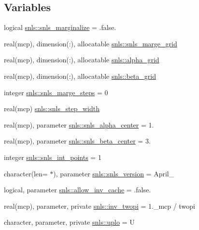 \subsection*{Variables}
\begin{DoxyCompactItemize}
\item 
logical \mbox{\hyperlink{namespacesnls_a06db14b2b9d3e226db5ba7a2a90617de}{snls\+::snls\+\_\+marginalize}} = .false.
\item 
real(mcp), dimension(\+:), allocatable \mbox{\hyperlink{namespacesnls_a0314289992414e577228e51eb768cb77}{snls\+::snls\+\_\+marge\+\_\+grid}}
\item 
real(mcp), dimension(\+:), allocatable \mbox{\hyperlink{namespacesnls_ac4adeb5ed9cc6b1ff8d81eb5c3f7614f}{snls\+::alpha\+\_\+grid}}
\item 
real(mcp), dimension(\+:), allocatable \mbox{\hyperlink{namespacesnls_a56411cdf57a0e9358f977a9dc70b1715}{snls\+::beta\+\_\+grid}}
\item 
integer \mbox{\hyperlink{namespacesnls_ad2d9ca2fa23ca065ff997f4b15114c53}{snls\+::snls\+\_\+marge\+\_\+steps}} = 0
\item 
real(mcp) \mbox{\hyperlink{namespacesnls_a3a7f05d5e17b5868642de17a8d101626}{snls\+::snls\+\_\+step\+\_\+width}}
\item 
real(mcp), parameter \mbox{\hyperlink{namespacesnls_a153b2cafcd96b5cf2ea20c31595180a0}{snls\+::snls\+\_\+alpha\+\_\+center}} = 1.
\item 
real(mcp), parameter \mbox{\hyperlink{namespacesnls_a82f9e1a099b4e59c715b4fef3c8171cc}{snls\+::snls\+\_\+beta\+\_\+center}} = 3.
\item 
integer \mbox{\hyperlink{namespacesnls_acf460aba70488a6ee73c575ab0e9d865}{snls\+::snls\+\_\+int\+\_\+points}} = 1
\item 
character(len= $\ast$), parameter \mbox{\hyperlink{namespacesnls_a919a8bb686436d27901e5de9a8880f26}{snls\+::snls\+\_\+version}} = \textquotesingle{}April\+\_\textquotesingle{}
\item 
logical, parameter \mbox{\hyperlink{namespacesnls_a8df88425e6d587341a52687ef62d81ae}{snls\+::allow\+\_\+inv\+\_\+cache}} = .false.
\item 
real(mcp), parameter, private \mbox{\hyperlink{namespacesnls_af91b609e54e5ac91712f0bb5303b5652}{snls\+::inv\+\_\+twopi}} = 1.\+\_\+mcp / twopi
\item 
character, parameter, private \mbox{\hyperlink{namespacesnls_a770d0a9cd7d82539ec94f8d27bb13c53}{snls\+::uplo}} = \textquotesingle{}U\textquotesingle{}

\end{DoxyCompactItemize}
